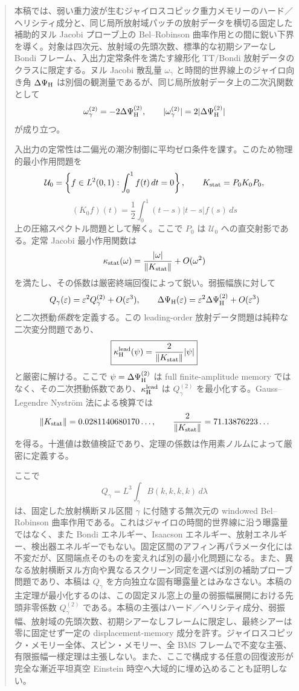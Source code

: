 \maketitle

\begin{abstract}
本稿では、弱い重力波が生むジャイロスコピック重力メモリーのハード／ヘリシティ成分と、同じ局所放射域パッチの放射データを横切る固定した補助的ヌル Jacobi プローブ上の Bel--Robinson 曲率作用との間に鋭い下界を導く。対象は四次元、放射域の先頭次数、標準的な初期シアーなし Bondi フレーム、入出力定常条件を満たす線形化 TT/Bondi 放射データのクラスに限定する。ヌル Jacobi 散乱量 $\omega_\gamma$ と時間的世界線上のジャイロ向き角 $\Delta\Psi_{\rm H}$ は別個の観測量であるが、同じ局所放射データ上の二次汎関数として
\[
\omega_\gamma^{(2)}=-2\Delta\Psi_{\rm H}^{(2)},\qquad
|\omega_\gamma^{(2)}|=2|\Delta\Psi_{\rm H}^{(2)}|
\]
が成り立つ。

入出力の定常性は二偏光の潮汐制御に平均ゼロ条件を課す。このため物理的最小作用問題を
\[
\mathcal U_0=\left\{f\in L^2(0,1):\int_0^1 f(t)\,dt=0\right\},\qquad
K_{\rm stat}=P_0K_0P_0,
\]
\[
(K_0f)(t)=\frac12\int_0^1(t-s)|t-s|f(s)\,ds
\]
上の圧縮スペクトル問題として解く。ここで $P_0$ は $\mathcal U_0$ への直交射影である。定常 Jacobi 最小作用関数は
\[
\kappa_{\rm stat}(\omega)=\frac{|\omega|}{\|K_{\rm stat}\|}+O(\omega^2)
\]
を満たし、その係数は厳密終端回復によって鋭い。弱振幅族に対して
\[
Q_\gamma(\eps)=\eps^2Q_\gamma^{(2)}+O(\eps^3),\qquad
\Delta\Psi_{\rm H}(\eps)=\eps^2\Delta\Psi_{\rm H}^{(2)}+O(\eps^3)
\]
と二次摂動\emph{係数}を定義する。この leading-order 放射データ問題は純粋な二次変分問題であり、
\[
\boxed{\kappa_{\rm H}^{\rm lead}(\psi)=\frac{2}{\|K_{\rm stat}\|}|\psi|}
\]
と厳密に解ける。ここで \(\psi=\Delta\Psi_{\rm H}^{(2)}\) は full finite-amplitude memory ではなく、その二次摂動係数であり、\(\kappa_{\rm H}^{\rm lead}\) は \(Q_\gamma^{(2)}\) を最小化する。Gauss--Legendre Nystr\"om 法による検算では
\[
\|K_{\rm stat}\|=0.0281140680170\ldots,\qquad
\frac{2}{\|K_{\rm stat}\|}=71.13876223\ldots
\]
を得る。十進値は数値検証であり、定理の係数は作用素ノルムによって厳密に定義する。

ここで
\[
Q_\gamma=L^3\int_\gamma B(k,k,k,k)\,d\lambda
\]
は、固定した放射横断ヌル区間 $\gamma$ に付随する無次元の windowed Bel--Robinson 曲率作用である。これはジャイロの時間的世界線に沿う曝露量ではなく、また Bondi エネルギー、Isaacson エネルギー、放射エネルギー、検出器エネルギーでもない。固定区間のアフィン再パラメータ化には不変だが、区間端点そのものを変えれば別の最小化問題になる。また、異なる放射横断ヌル方向や異なるスクリーン同定を選べば別の補助プローブ問題であり、本稿は $Q_\gamma$ を方向独立な固有曝露量とはみなさない。本稿の主定理が最小化するのは、この固定ヌル窓上の量の弱振幅展開における先頭非零係数 $Q_\gamma^{(2)}$ である。本稿の主張はハード／ヘリシティ成分、弱振幅、放射域の先頭次数、初期シアーなしフレームに限定し、最終シアーは零に固定せず一定の displacement-memory 成分を許す。ジャイロスコピック・メモリー全体、スピン・メモリー、全 BMS フレームで不変な主張、有限振幅一様定理は主張しない。また、ここで構成する任意の回復波形が完全な漸近平坦真空 Einstein 時空へ大域的に埋め込めることも証明しない。
\end{abstract}

